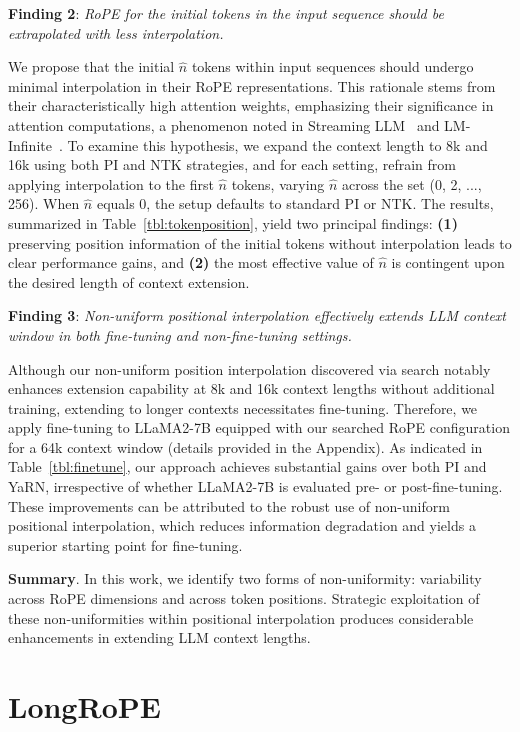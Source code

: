 \textbf{Finding 2}: \textit{RoPE for the initial tokens in the input sequence should be extrapolated with less interpolation.} 

We propose that the initial $\hat{n}$ tokens within input sequences should undergo minimal interpolation in their RoPE representations. This rationale stems from their characteristically high attention weights, emphasizing their significance in attention computations, a phenomenon noted in Streaming LLM~\cite{streamingllm} and LM-Infinite~\cite{han2023lminfinite}. To examine this hypothesis, we expand the context length to 8k and 16k using both PI and NTK strategies, and for each setting, refrain from applying interpolation to the first $\hat n$ tokens, varying $\hat n$ across the set (0, 2, ..., 256). When $\hat n$ equals 0, the setup defaults to standard PI or NTK. The results, summarized in Table~\ref{tbl:tokenposition}, yield two principal findings: \textbf{(1)} preserving position information of the initial tokens without interpolation leads to clear performance gains, and \textbf{(2)} the most effective value of $\hat n$ is contingent upon the desired length of context extension.

\textbf{Finding 3}: \textit{Non-uniform positional interpolation effectively extends LLM context window in both fine-tuning and non-fine-tuning settings.} 

Although our non-uniform position interpolation discovered via search notably enhances extension capability at 8k and 16k context lengths without additional training, extending to longer contexts necessitates fine-tuning. Therefore, we apply fine-tuning to LLaMA2-7B equipped with our searched RoPE configuration for a 64k context window (details provided in the Appendix). As indicated in Table~\ref{tbl:finetune}, our approach achieves substantial gains over both PI and YaRN, irrespective of whether LLaMA2-7B is evaluated pre- or post-fine-tuning. These improvements can be attributed to the robust use of non-uniform positional interpolation, which reduces information degradation and yields a superior starting point for fine-tuning.

\textbf{Summary}. In this work, we identify two forms of non-uniformity: variability across RoPE dimensions and across token positions. Strategic exploitation of these non-uniformities within positional interpolation produces considerable enhancements in extending LLM context lengths.

\section{LongRoPE}

